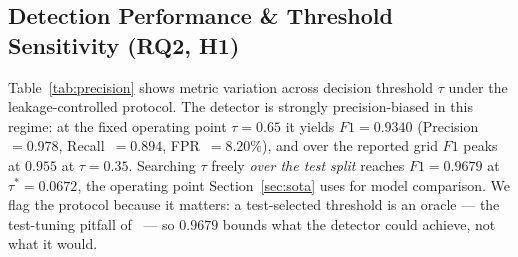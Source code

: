\documentclass[conference,a4paper]{IEEEtran}
\begin{document}
\begin{table}[htbp]
\caption{Per-Stage Software Control-Path Latency ($n=1000$ trials, Redis~7.2.4 localhost, HMAC principals). Excludes dataplane enforcement. Shares are of the median total and do not sum to $100$ because medians are not additive.}
\label{tab:latency}
\begin{center}
\end{center}
\end{table}

\subsection{Detection Performance \& Threshold Sensitivity (RQ2, H1)}
\label{sec:threshold}
Table~\ref{tab:precision} shows metric variation across decision threshold $\tau$ under the leakage-controlled protocol. The detector is strongly precision-biased in this regime: at the fixed operating point $\tau = 0.65$ it yields $F1 = 0.9340$ (Precision~$=0.978$, Recall~$=0.894$, FPR~$=8.20\%$), and over the reported grid $F1$ peaks at $0.955$ at $\tau = 0.35$. Searching $\tau$ freely \emph{over the test split} reaches $F1 = 0.9679$ at $\tau^* = 0.0672$, the operating point Section~\ref{sec:sota} uses for model comparison. We flag the protocol because it matters: a test-selected threshold is an oracle --- the test-tuning pitfall of~\cite{b23} --- so $0.9679$ bounds what the detector could achieve, not what it would.
\end{document}
